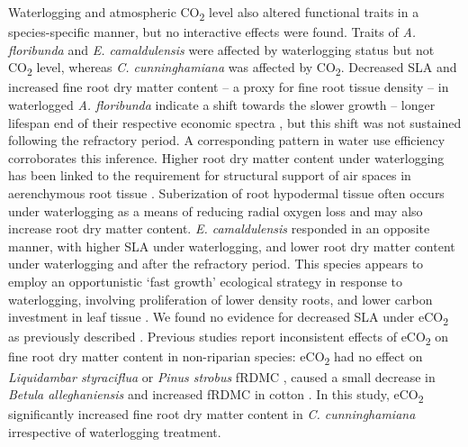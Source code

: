 \documentclass[12pt,a4paper]{memoir}
\begin{document}
Waterlogging and atmospheric CO\textsubscript{2} level also altered functional traits in a species-specific manner, but no interactive effects were found. Traits of \textit{A. floribunda} and \textit{E. camaldulensis} were affected by waterlogging status but not CO\textsubscript{2} level, whereas \textit{C. cunninghamiana} was affected by CO\textsubscript{2}. Decreased SLA and increased fine root dry matter content – a proxy for fine root tissue density \citep{Birouste2013} – in waterlogged \textit{A. floribunda} indicate a shift towards the slower growth – longer lifespan  end of their respective economic spectra \citep{Reich2014}, but this shift was not sustained following the refractory period. A corresponding pattern in water use efficiency corroborates this inference. Higher root dry matter content under waterlogging has been linked to the requirement for structural support of air spaces in aerenchymous root tissue \citep{Ryser2011}. Suberization of root hypodermal tissue often occurs under waterlogging as a means of reducing radial oxygen loss \citep{Visser2000, DeSimone2002} and may also increase root dry matter content. \textit{E. camaldulensis} responded in an opposite manner, with higher SLA under waterlogging, and lower root dry matter content under waterlogging and after the refractory period. This species appears to employ an opportunistic ‘fast growth’ ecological strategy in response to waterlogging, involving proliferation of lower density roots, and lower carbon investment in leaf tissue \citep{Wright2004, Reich2014}. We found no evidence for decreased SLA under eCO\textsubscript{2} as previously described \citep{Poorter2003a}. Previous studies report inconsistent effects of eCO\textsubscript{2} on fine root dry matter content in non-riparian species: eCO\textsubscript{2} had no effect on \textit{Liquidambar styraciflua} or \textit{Pinus strobus} fRDMC \citep{Bauer2001,Iversen2008}, caused a small decrease in \textit{Betula alleghaniensis} \citep{Bauer2001} and increased fRDMC in cotton \citep{Prior1994}. In this study, eCO\textsubscript{2} significantly increased fine root dry matter content in \textit{C. cunninghamiana} irrespective of waterlogging treatment.
\end{document}
